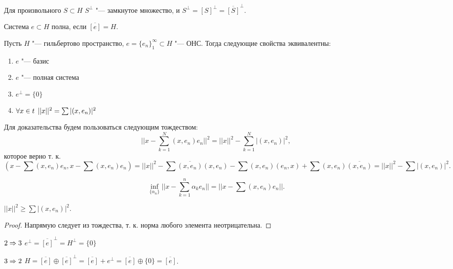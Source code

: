 \documentclass[main]{subfiles}
\begin{document}
\begin{exercise}
  Для произвольного \( S \subset H \) \( S^\perp \) "--- замкнутое множество,
  и \( S^\perp = {[S]}^\perp = \overline{[S]}^\perp \).
\end{exercise}

\begin{definition}
  Система \( e \subset H \) полна, если \( \overline{[e]} = H \).
\end{definition}

\begin{theorem}
  Пусть \( H \) "--- гильбертово пространство,
  \( e = \{ e_n \}_1^\infty \subset H \) "--- ОНС.
  Тогда следующие свойства эквивалентны:
  \begin{enumerate}
    \item \( e \) "--- базис
    \item \( e \) "--- полная система
    \item \( e^\perp = \{ 0 \} \)
    \item \( \forall {x \in t} \; \, ||x||^2 = \sum |(x, e_n)|^2 \)
  \end{enumerate}
\end{theorem}

Для доказательства будем пользоваться следующим тождеством:
\[ ||x - \sum_{k = 1}^N (x, e_n) e_n||^2 = ||x||^2 - \sum_{k=1}^N |(x, e_n)|^2, \]
которое верно т. к.
\[ (x - \sum (x, e_n) e_n, x - \sum (x, e_n) e_n) =
  ||x||^2 - \sum \overline{(x, e_n)} (x, e_n) -
  \sum (x, e_n) (e_n, x) + \sum (x, e_n)\overline{(x, e_n)} =
||x||^2 - \sum |(x, e_n)|^2. \]

\begin{lemma}
  \[ \inf_{\{ \alpha_n \}} ||x - \sum_{k = 1}^n \alpha_k e_n|| =
  ||x - \sum (x, e_n) e_n||. \]
\end{lemma}

\begin{lemma}
  \( ||x||^2 \ge \sum |(x, e_n)|^2 \).
\end{lemma}
\begin{proof}
  Напрямую следует из тождества, т. к. норма любого элемента неотрицательна.
\end{proof}

\begin{itemproof}%
\item[\( 2 \Rightarrow 3 \)] \( e^\perp = \overline{[e]}^\perp = H^\perp = \{ 0 \} \)
\item[\( 3 \Rightarrow 2 \)] \( H = \overline{[e]} \oplus \overline{[e]}^\perp =
  \overline{[e]} + e^\perp = \overline{[e]} \oplus \{ 0 \} = \overline{[e]} \).
\end{itemproof}
\end{document}
